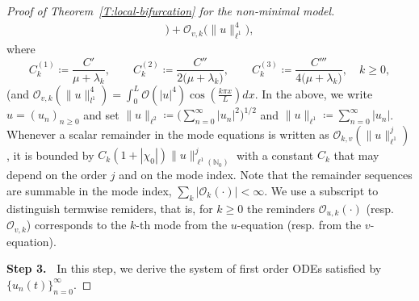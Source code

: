 \documentclass[11pt]{article} %
\theoremstyle{remark}
\theoremstyle{remark}
\numberwithin{equation}{section}
\numberwithin{figure}{section}
\numberwithin{table}{section}
\begin{document}
\begin{proof}[Proof of Theorem~\ref{T:local-bifurcation}  for the non-minimal model]
\begin{align}
    \Big)
    +\mathcal{O}_{v,k}\Big(\|u\|_{\ell^1}^4\Big),
  \end{align}
  where
  \begin{equation}\label{E:Ck-restated}
    C_k^{(1)} \coloneqq \frac{C'}{\mu+\lambda_k}, \qquad
    C_k^{(2)} \coloneqq \frac{C''}{2\bigl(\mu+\lambda_k\bigr)}, \qquad
    C_k^{(3)} \coloneqq \frac{C'''}{4\bigl(\mu+\lambda_k\bigr)},\quad
    k\ge0,
  \end{equation}
  { (and $\mathcal{O}_{v,k}(\|u\|_{l^1}^4)=\int_0^L \mathcal{O}(|u|^4)\cos(\frac{k\pi x}{L})dx$.}
  In the above, we write $u = (u_n)_{n\ge 0}$ and set $\|u\|_{\ell^2} \coloneqq
  \Big(\sum_{n=0}^\infty |u_n|^2\Big)^{1/2}$ and $\|u\|_{\ell^1} \coloneqq
  \sum_{n=0}^\infty |u_n|$. Whenever a scalar remainder in the mode equations is
  written as ${ \mathcal{O}_{k,v}}(\|u\|_{\ell^1}^j)$, it is bounded by $C_k(1 +
  |\chi_0|)\|u\|_{\ell^1(\mathbb{N}_0)}^j$ with a constant $C_k$ that may depend
  on the order $j$ and on the mode index. Note that the remainder sequences are
  summable in the mode index, $\sum_k|\mathcal{O}_k(\cdot)| < \infty$. We
  use a subscript to distinguish termwise remiders, that is, for $k\ge0$ the
  reminders $\mathcal{O}_{u,k}(\cdot)$ (resp. $\mathcal{O}_{v,k}$) corresponds to
  the $k$-th mode from the $u$-equation (resp. from the $v$-equation).


  \smallskip

  \noindent\textbf{Step 3.~} In this step, we derive the system of first order
  ODEs satisfied by $\{u_n(t)\}_{n=0}^\infty$.


  \smallskip


\end{proof}
\end{document}
